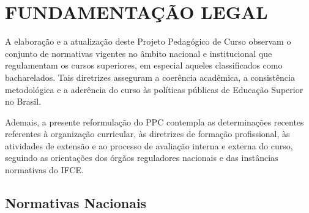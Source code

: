 
\section{\MakeUppercase{Fundamentação Legal}}
\label{FUNDAMENTAÇÃO LEGAL}

A elaboração e a atualização deste Projeto Pedagógico de Curso observam o conjunto de normativas vigentes no âmbito nacional e institucional que regulamentam os cursos superiores, em especial aqueles classificados como bacharelados. Tais diretrizes asseguram a coerência acadêmica, a consistência metodológica e a aderência do curso às políticas públicas de Educação Superior no Brasil.

Ademais, a presente reformulação do PPC contempla as determinações recentes referentes à organização curricular, às diretrizes de formação profissional, às atividades de extensão e ao processo de avaliação interna e externa do curso, seguindo as orientações dos órgãos reguladores nacionais e das instâncias normativas do IFCE.

\subsection{Normativas Nacionais}

